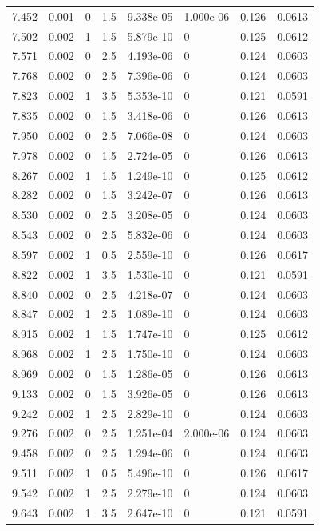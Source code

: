 \documentclass[preview]{standalone}
\begin{document}
{{{\begin{tabular}{L{1.2cm}C{1.2cm} C{0.3cm}C{0.5cm} C{1.4cm}C{1.4cm} C{1.4cm}C{1.4cm}}
  7.452  &  0.001  & 0     & 1.5 &  9.338e-05  & 1.000e-06  & 0.126 &  0.0613   \\ 
  7.502  &  0.002  & 1     & 1.5 &  5.879e-10  & 0  & 0.125 &  0.0612   \\ 
  7.571  &  0.002  & 0     & 2.5 &  4.193e-06  & 0  & 0.124 &  0.0603   \\ 
  7.768  &  0.002  & 0     & 2.5 &  7.396e-06  & 0  & 0.124 &  0.0603   \\ 
  7.823  &  0.002  & 1     & 3.5 &  5.353e-10  & 0  & 0.121 &  0.0591   \\ 
  7.835  &  0.002  & 0     & 1.5 &  3.418e-06  & 0  & 0.126 &  0.0613   \\ 
  7.950  &  0.002  & 0     & 2.5 &  7.066e-08  & 0  & 0.124 &  0.0603   \\ 
  7.978  &  0.002  & 0     & 1.5 &  2.724e-05  & 0  & 0.126 &  0.0613   \\ 
  8.267  &  0.002  & 1     & 1.5 &  1.249e-10  & 0  & 0.125 &  0.0612   \\ 
  8.282  &  0.002  & 0     & 1.5 &  3.242e-07  & 0  & 0.126 &  0.0613   \\ 
  8.530  &  0.002  & 0     & 2.5 &  3.208e-05  & 0  & 0.124 &  0.0603   \\ 
  8.543  &  0.002  & 0     & 2.5 &  5.832e-06  & 0  & 0.124 &  0.0603   \\ 
  8.597  &  0.002  & 1     & 0.5 &  2.559e-10  & 0  & 0.126 &  0.0617   \\ 
  8.822  &  0.002  & 1     & 3.5 &  1.530e-10  & 0  & 0.121 &  0.0591   \\ 
  8.840  &  0.002  & 0     & 2.5 &  4.218e-07  & 0  & 0.124 &  0.0603   \\ 
  8.847  &  0.002  & 1     & 2.5 &  1.089e-10  & 0  & 0.124 &  0.0603   \\ 
  8.915  &  0.002  & 1     & 1.5 &  1.747e-10  & 0  & 0.125 &  0.0612   \\ 
  8.968  &  0.002  & 1     & 2.5 &  1.750e-10  & 0  & 0.124 &  0.0603   \\ 
  8.969  &  0.002  & 0     & 1.5 &  1.286e-05  & 0  & 0.126 &  0.0613   \\ 
  9.133  &  0.002  & 0     & 1.5 &  3.926e-05  & 0  & 0.126 &  0.0613   \\ 
  9.242  &  0.002  & 1     & 2.5 &  2.829e-10  & 0  & 0.124 &  0.0603   \\ 
  9.276  &  0.002  & 0     & 2.5 &  1.251e-04  & 2.000e-06  & 0.124 &  0.0603   \\ 
  9.458  &  0.002  & 0     & 2.5 &  1.294e-06  & 0  & 0.124 &  0.0603   \\ 
  9.511  &  0.002  & 1     & 0.5 &  5.496e-10  & 0  & 0.126 &  0.0617   \\ 
  9.542  &  0.002  & 1     & 2.5 &  2.279e-10  & 0  & 0.124 &  0.0603   \\ 
  9.643  &  0.002  & 1     & 3.5 &  2.647e-10  & 0  & 0.121 &  0.0591   \\ 
\hline 
\end{tabular} 

}}}
\end{document}
